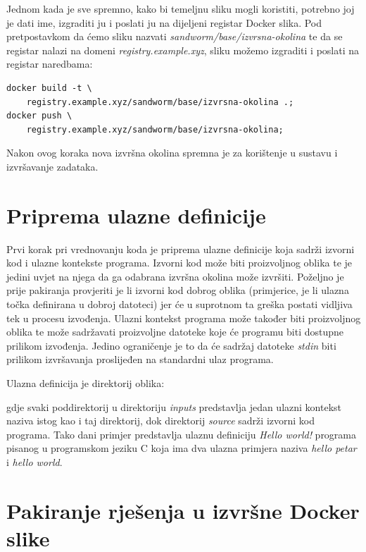 \documentclass[times, utf8, zavrsni]{fer}
\begin{document}
{{\begin{appendices}
Jednom kada je sve spremno, kako bi temeljnu sliku mogli koristiti, potrebno joj je dati ime, izgraditi ju i poslati ju na dijeljeni registar Docker slika. Pod pretpostavkom da ćemo sliku nazvati {\textit{sandworm/base/izvrsna-okolina}} te da se registar nalazi na domeni {\textit{registry.example.xyz}}, sliku možemo izgraditi i poslati na registar naredbama:

\begin{lstlisting}
docker build -t \
	registry.example.xyz/sandworm/base/izvrsna-okolina .;
docker push \
	registry.example.xyz/sandworm/base/izvrsna-okolina;
\end{lstlisting}

Nakon ovog koraka nova izvršna okolina spremna je za korištenje u sustavu i izvršavanje zadataka.

\section{Priprema ulazne definicije}

Prvi korak pri vrednovanju koda je priprema ulazne definicije koja sadrži izvorni kod i ulazne kontekste programa. Izvorni kod može biti proizvoljnog oblika te je jedini uvjet na njega da ga odabrana izvršna okolina može izvršiti. Poželjno je prije pakiranja provjeriti je li izvorni kod dobrog oblika (primjerice, je li ulazna točka definirana u dobroj datoteci) jer će u suprotnom ta greška postati vidljiva tek u procesu izvođenja. Ulazni kontekst programa može također biti proizvoljnog oblika te može sadržavati proizvoljne datoteke koje će programu biti dostupne prilikom izvođenja. Jedino ograničenje je to da će sadržaj datoteke {\textit{stdin}} biti prilikom izvršavanja proslijeđen na standardni ulaz programa.

Ulazna definicija je direktorij oblika:


gdje svaki poddirektorij u direktoriju {\textit{inputs}} predstavlja jedan ulazni kontekst naziva istog kao i taj direktorij, dok direktorij {\textit{source}} sadrži izvorni kod programa. Tako dani primjer predstavlja ulaznu definiciju {\textit{Hello world!}} programa pisanog u programskom jeziku C koja ima dva ulazna primjera naziva {\textit{hello petar}} i {\textit{hello world}}.

\section{Pakiranje rješenja u izvršne Docker slike}


\end{appendices}}}
\end{document}

